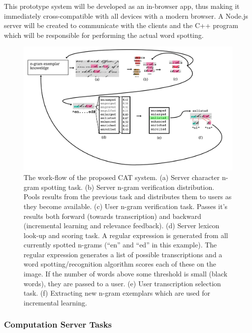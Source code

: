 \documentclass[ms]{byuprop}
\begin{document}
This prototype system will be developed as an in-browser app, thus making it immediately cross-compatible with all devices with a modern browser. A Node.js server will be created to communicate with the clients and the C++ program which will be responsible for performing the actual word spotting.

\begin{figure}
    \centering
    \includegraphics[width=.95\textwidth]{flow6}
    \caption{The work-flow of the proposed CAT system. (a) Server character n-gram spotting task. (b) Server n-gram verification distribution. Pools results from the previous task and distributes them to users as they become available. (c) User n-gram verification task. Passes it's results both forward (towards transcription) and backward (incremental learning and relevance feedback). (d) Server lexicon look-up and scoring task. A regular expression is generated from all currently spotted n-grams (``en'' and ``ed'' in this example). The regular expression generates a list of possible transcriptions and a word spotting/recognition algorithm scores each of these on the image. If the number of words above some threshold is small (black words), they are passed to a user. (e) User transcription selection task. (f) Extracting new n-gram exemplars which are used for incremental learning.}
    \label{fig:system_diagram}
\end{figure}


\subsubsection{Computation Server Tasks}
\end{document}
